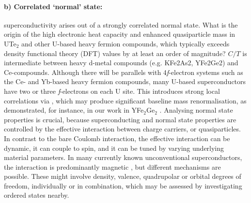 \paragraph{b) Correlated `normal' state:} %
superconductivity arises out of a strongly correlated normal state. What is the origin of the high electronic heat capacity and enhanced quasiparticle mass in UTe$_2$ and other U-based heavy fermion compounds, which typically exceeds density functional theory (DFT) values by at least an order of magnitude? $C/T$ is intermediate between heavy d-metal compounds (e.g. KFe2As2, YFe2Ge2) and Ce-compounds.
Although there will be parallels with 4{\em f}-electron systems such as the Ce- and Yb-based heavy fermion compounds, many U-based superconductors have two or three {\emph f}-electrons on each U site. This introduces strong local correlations via , which may produce significant baseline mass renormalisation, as demonstrated, for instance, in our work in YFe$_2$Ge$_2$ \cite{baglo22a}. Analysing normal state properties is crucial, because  superconducting and normal state properties are controlled by the effective interaction between charge carriers, or quasiparticles. In contrast to the bare Coulomb interaction, the effective interaction can be dynamic, it can couple to spin, and it can be tuned by varying underlying material parameters. In many currently known unconventional superconductors, the interaction is predominantly magnetic \cite{monthoux07}, but different mechanisms are possible. These might involve density, valence, quadrupolar or orbital degrees of freedom, individually or in combination, which may be assessed by investigating ordered states nearby. %



